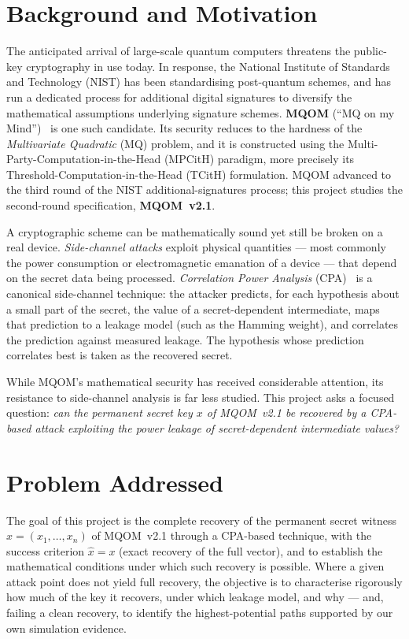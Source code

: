 \section{Background and Motivation}

The anticipated arrival of large-scale quantum computers threatens the public-key
cryptography in use today. In response, the National Institute of Standards and
Technology (NIST) has been standardising post-quantum schemes, and has run a dedicated
process for additional digital signatures to diversify the mathematical assumptions
underlying signature schemes. \textbf{MQOM} (``MQ on my Mind'')~\cite{mqomspec} is one
such candidate. Its security reduces to the hardness of the \emph{Multivariate
Quadratic} (MQ) problem, and it is constructed using the
Multi-Party-Computation-in-the-Head (MPCitH) paradigm, more precisely its
Threshold-Computation-in-the-Head (TCitH) formulation. MQOM advanced to the third round
of the NIST additional-signatures process; this project studies the second-round
specification, \textbf{MQOM~v2.1}.

A cryptographic scheme can be mathematically sound yet still be broken on a real device.
\emph{Side-channel attacks} exploit physical quantities --- most commonly the power
consumption or electromagnetic emanation of a device --- that depend on the secret data
being processed. \emph{Correlation Power Analysis} (CPA)~\cite{brier2004cpa} is a
canonical side-channel technique: the attacker predicts, for each hypothesis about a
small part of the secret, the value of a secret-dependent intermediate, maps that
prediction to a leakage model (such as the Hamming weight), and correlates the
prediction against measured leakage. The hypothesis whose prediction correlates best is
taken as the recovered secret.

While MQOM's mathematical security has received considerable attention, its resistance
to side-channel analysis is far less studied. This project asks a focused question:
\emph{can the permanent secret key $x$ of MQOM~v2.1 be recovered by a CPA-based attack
exploiting the power leakage of secret-dependent intermediate values?}

\section{Problem Addressed}

The goal of this project is the complete recovery of the permanent secret witness
$x = (x_1, \dots, x_n)$ of MQOM~v2.1 through a CPA-based technique, with the success
criterion $\hat{x} = x$ (exact recovery of the full vector), and to establish the
mathematical conditions under which such recovery is possible. Where a given attack
point does not yield full recovery, the objective is to characterise rigorously how
much of the key it recovers, under which leakage model, and why --- and, failing a
clean recovery, to identify the highest-potential paths supported by our own
simulation evidence.

